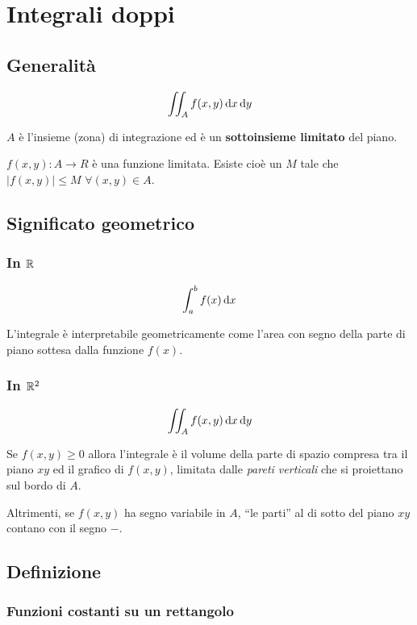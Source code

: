 \chapter{Integrali doppi}

\section{Generalità}

$$\iint_A f(x,y) \mathop{}\!\mathrm{d} x \mathop{}\!\mathrm{d} y$$

$A$ è l'insieme (zona) di integrazione ed è un \textbf{sottoinsieme limitato} del piano.

$f(x,y) : A \to R$ è una funzione limitata. Esiste cioè un $M$ tale che $|f(x,y)| \leq M$ $\forall (x,y) \in A$.

\section{Significato geometrico}

\subsection{In $\mathbb{R}$}

$$\int_a^b f(x) \mathop{}\!\mathrm{d} x$$

L'integrale è interpretabile geometricamente come l'area con segno della parte di piano sottesa dalla funzione $f(x)$.

\subsection{In $\mathbb{R}^2$}

$$\iint_A f(x,y) \mathop{}\!\mathrm{d} x \mathop{}\!\mathrm{d} y$$

Se $f(x,y) \ge 0$ allora l'integrale è il volume della parte di spazio compresa tra il piano $xy$ ed il grafico di $f(x,y)$, limitata dalle \textit{pareti verticali} che si proiettano sul bordo di $A$.

Altrimenti, se $f(x,y)$ ha segno variabile in $A$, ``le parti'' al di sotto del piano $xy$ contano con il segno $-$.

\section{Definizione}

\subsection{Funzioni costanti su un rettangolo}

